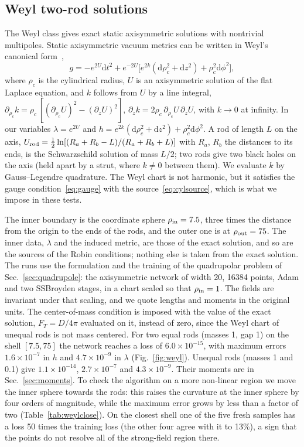 \documentclass[aps,prd,twocolumn,superscriptaddress, nofootinbib,floatfix]{revtex4-2}
\newcommand{\dd}{\mathrm{d}}
\begin{document}
\subsection{Weyl two-rod solutions}\label{sec:weylsol}

The Weyl class gives exact static axisymmetric solutions with nontrivial multipoles.
Static axisymmetric vacuum metrics can be written in Weyl's canonical form~\cite{Weyl1917},
\begin{equation}
  g = -e^{2U}\dd t^2 + e^{-2U}\bigl[e^{2k}(\dd\rho_c^2+\dd z^2)+\rho_c^2\dd\phi^2\bigr],
  \label{eq:weyl}
\end{equation}
where $\rho_c$ is the cylindrical radius, $U$ is an axisymmetric solution of the flat Laplace equation, and $k$ follows from $U$ by a line integral, $\partial_{\rho_c}k = \rho_c\,[(\partial_{\rho_c}U)^2-(\partial_zU)^2]$, $\partial_zk = 2\rho_c\,\partial_{\rho_c}U\,\partial_zU$, with $k\to0$ at infinity.
In our variables $\lambda = e^{2U}$ and $h = e^{2k}(\dd\rho_c^2+\dd z^2)+\rho_c^2\dd\phi^2$.
A rod of length $L$ on the axis, $U_{\rm rod} = \tfrac12\ln[(R_a+R_b-L)/(R_a+R_b+L)]$ with $R_a$, $R_b$ the distances to its ends, is the Schwarzschild solution of mass $L/2$; two rods give two black holes on the axis (held apart by a strut, where $k\neq0$ between them).
We evaluate $k$ by Gauss--Legendre quadrature.
The Weyl chart is not harmonic, but it satisfies the gauge condition~\eqref{eq:gauge} with the source~\eqref{eq:cylsource}, which is what we impose in these tests.

The inner boundary is the coordinate sphere $\rho_{\rm in}=7.5$, three times the distance from the origin to the ends of the rods, and the outer one is at $\rho_{\rm out}=75$.
The inner data, $\lambda$ and the induced metric, are those of the exact solution, and so are the sources of the Robin conditions; nothing else is taken from the exact solution.
The runs use the formulation and the training of the quadrupolar problem of Sec.~\ref{sec:quadrupole}: the axisymmetric network of width 20, 16384 points, Adam and two SSBroyden stages, in a chart scaled so that $\rho_{\rm in}=1$.
The fields are invariant under that scaling, and we quote lengths and moments in the original units.
The center-of-mass condition is imposed with the value of the exact solution, $F_T=D/4\pi$ evaluated on it, instead of zero, since the Weyl chart of unequal rods is not mass centered.
For two equal rods (masses 1, gap 1) on the shell $[7.5,75]$ the network reaches a loss of $6.0\times10^{-15}$, with maximum errors $1.6\times10^{-7}$ in $h$ and $4.7\times10^{-9}$ in $\lambda$ (Fig.~\ref{fig:weyl}).
Unequal rods (masses 1 and 0.1) give $1.1\times10^{-14}$, $2.7\times10^{-7}$ and $4.3\times10^{-9}$.
Their moments are in Sec.~\ref{sec:moments}.
To check the algorithm on a more non-linear region we move the inner sphere towards the rods: this raises the curvature at the inner sphere by four orders of magnitude, while the maximum error grows by less than a factor of two (Table~\ref{tab:weylclose}).
On the closest shell one of the five fresh samples has a loss 50 times the training loss (the other four agree with it to 13\%), a sign that the points do not resolve all of the strong-field region there.
\end{document}
